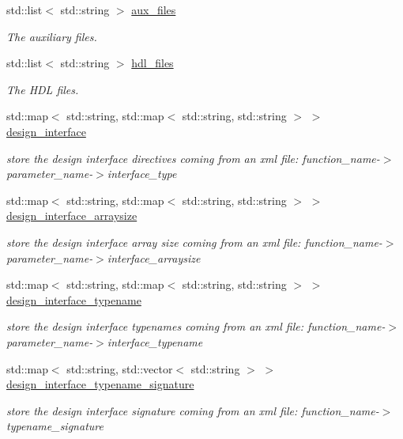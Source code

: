 \begin{DoxyCompactItemize}
std\+::list$<$ std\+::string $>$ \hyperlink{classHLS__manager_a98809821a94ac786b2564bc01451a357}{aux\+\_\+files}
\begin{DoxyCompactList}\small\item\em The auxiliary files. \end{DoxyCompactList}\item 
std\+::list$<$ std\+::string $>$ \hyperlink{classHLS__manager_aa9cb0d2a7ccfcbfd7cf33b4e195752ed}{hdl\+\_\+files}
\begin{DoxyCompactList}\small\item\em The H\+DL files. \end{DoxyCompactList}\item 
std\+::map$<$ std\+::string, std\+::map$<$ std\+::string, std\+::string $>$ $>$ \hyperlink{classHLS__manager_ad77152ba7f522e214719ec634c93da3d}{design\+\_\+interface}
\begin{DoxyCompactList}\small\item\em store the design interface directives coming from an xml file\+: function\+\_\+name-\/$>$parameter\+\_\+name-\/$>$interface\+\_\+type \end{DoxyCompactList}\item 
std\+::map$<$ std\+::string, std\+::map$<$ std\+::string, std\+::string $>$ $>$ \hyperlink{classHLS__manager_abd07511b7c43284d488e91b0188fc70c}{design\+\_\+interface\+\_\+arraysize}
\begin{DoxyCompactList}\small\item\em store the design interface array size coming from an xml file\+: function\+\_\+name-\/$>$parameter\+\_\+name-\/$>$interface\+\_\+arraysize \end{DoxyCompactList}\item 
std\+::map$<$ std\+::string, std\+::map$<$ std\+::string, std\+::string $>$ $>$ \hyperlink{classHLS__manager_ad3f5bf7e9716c1ca11f291f3cc940c17}{design\+\_\+interface\+\_\+typename}
\begin{DoxyCompactList}\small\item\em store the design interface typenames coming from an xml file\+: function\+\_\+name-\/$>$parameter\+\_\+name-\/$>$interface\+\_\+typename \end{DoxyCompactList}\item 
std\+::map$<$ std\+::string, std\+::vector$<$ std\+::string $>$ $>$ \hyperlink{classHLS__manager_abe078d82e1b4bcd0d90e35641752ddb1}{design\+\_\+interface\+\_\+typename\+\_\+signature}
\begin{DoxyCompactList}\small\item\em store the design interface signature coming from an xml file\+: function\+\_\+name-\/$>$typename\+\_\+signature \end{DoxyCompactList}\item 

\end{DoxyCompactItemize}

